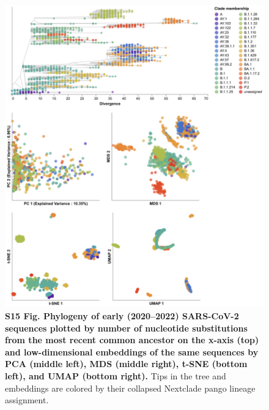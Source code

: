 \documentclass[10pt,letterpaper]{article}
\begin{document}
\begin{figure}[!h]
\includegraphics[width=\columnwidth]{figures/sarscov2-embeddings-by-Nextclade_pango_collapsed-clade.png}
\caption*{{\bf S15 Fig. Phylogeny of early (2020--2022) SARS-CoV-2 sequences plotted by number of nucleotide substitutions from the most recent common ancestor on the x-axis (top) and low-dimensional embeddings of the same sequences by PCA (middle left), MDS (middle right), t-SNE (bottom left), and UMAP (bottom right).}
  Tips in the tree and embeddings are colored by their collapsed Nextclade pango lineage assignment.
}
\end{figure}
\end{document}
